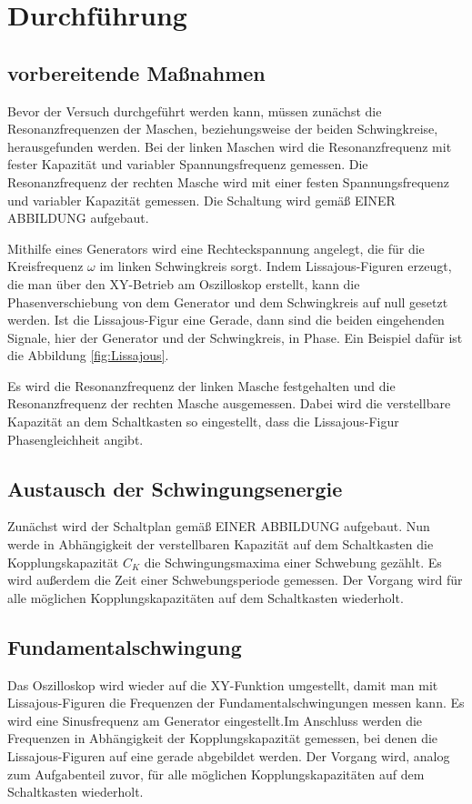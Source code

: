 \section{Durchführung}
\label{sec:Durchführung}

\subsection{vorbereitende Maßnahmen}
Bevor der Versuch durchgeführt werden kann, müssen zunächst die Resonanzfrequenzen der Maschen, beziehungsweise der beiden Schwingkreise,
herausgefunden werden.
Bei der linken Maschen wird die Resonanzfrequenz mit fester Kapazität und variabler Spannungsfrequenz %
gemessen. Die Resonanzfrequenz der rechten Masche wird mit einer festen Spannungsfrequenz und variabler Kapazität  gemessen.
Die Schaltung wird gemäß EINER ABBILDUNG  aufgebaut. 

Mithilfe eines Generators wird eine Rechteckspannung angelegt, die  für die Kreisfrequenz $\omega$ im linken Schwingkreis sorgt. 
Indem Lissajous-Figuren erzeugt, die man über den XY-Betrieb am Oszilloskop erstellt, kann die Phasenverschiebung von dem Generator und 
dem Schwingkreis auf null gesetzt werden. Ist die Lissajous-Figur eine Gerade, dann sind die beiden eingehenden Signale, hier der
Generator und der Schwingkreis, in Phase. Ein Beispiel dafür ist die Abbildung \ref{fig:Lissajous}.

Es wird die Resonanzfrequenz der linken Masche festgehalten und die Resonanzfrequenz der rechten Masche ausgemessen.
Dabei wird die verstellbare Kapazität an dem Schaltkasten so eingestellt, dass die Lissajous-Figur Phasengleichheit angibt.

\subsection{Austausch der Schwingungsenergie}
Zunächst wird der Schaltplan gemäß EINER ABBILDUNG aufgebaut. Nun werde in Abhängigkeit der verstellbaren Kapazität auf dem Schaltkasten
die Kopplungskapazität $C_K$ die Schwingungsmaxima einer Schwebung gezählt. Es wird außerdem die Zeit einer Schwebungsperiode gemessen.
Der Vorgang wird für alle möglichen Kopplungskapazitäten auf dem Schaltkasten wiederholt.

\subsection{Fundamentalschwingung}
Das Oszilloskop wird wieder auf die XY-Funktion umgestellt, damit man mit Lissajous-Figuren die Frequenzen der Fundamentalschwingungen messen kann. 
Es wird eine Sinusfrequenz am Generator eingestellt.Im Anschluss werden die Frequenzen in Abhängigkeit der Kopplungskapazität gemessen, bei denen 
die Lissajous-Figuren auf eine gerade abgebildet werden. Der Vorgang wird, analog zum Aufgabenteil zuvor, für alle möglichen Kopplungskapazitäten 
auf dem Schaltkasten wiederholt.

